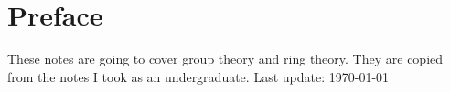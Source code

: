 \documentclass[10pt,twoside,openany]{memoir}
\begin{document}
    \tableofcontents

    \chapter*{Preface}
    These notes are going to cover group theory and ring theory. They are copied from the notes I took as an undergraduate.
    \vfill
    \specialdate
    Last update: \today

    
\end{document}
